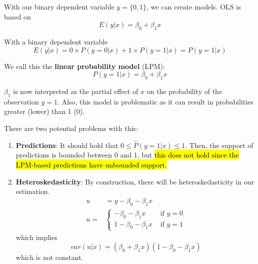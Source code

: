 \documentclass[11pt]{article}
\begin{document}
With our binary dependent variable $y=\{0,1\}$, we can create models. OLS is based on
\[E(y|x) = \beta_0 + \beta_1 x\]

With a binary dependent variable
\[E(y|x) = 0 \times P(y=0|x) + 1\times P(y=1|x) = P(y=1|x)\]

We call this the \textbf{linear probability model} (LPM):
\begin{equation}
    \label{linear probability model}
    P(y=1|x) = \beta_0 + \beta_1 x
\end{equation}
\begin{note}
    $\beta_1$ is now interpreted as the partial effect of $x$ on the probability of the observation $y=1$. Also, this model is problematic as it can result in probabilities greater (lower) than 1 (0).
\end{note}

\begin{shaded}
There are two potential problems with this:
\begin{enumerate}
    \item \textbf{Predictions}: It should hold that $0\leq \hat{P}(y=1|x) \leq1$. Then, the support of predictions is bounded between 0 and 1, but \hl{this does not hold since the LPM-based predictions have unbounded support.}

    \item \textbf{Heteroskedasticity}: By construction, there will be heteroskedasticity in our estimation.
    \begin{equation}
        \begin{aligned}
        u &= y-\beta_0 - \beta_1 x \\
        u =& \begin{cases}
            - \beta_0 - \beta_1 x & \text{ if } y = 0 \\
            1 - \beta_0 - \beta_1 x & \text{ if } y = 1
        \end{cases}
        \end{aligned}
    \end{equation}
    which implies
    \begin{equation}
        \label{heteroskedasticity in LPM}
        var(u|x) = (\beta_0 + \beta_1 x)(1 - \beta_0 - \beta_1 x)
    \end{equation}
    which is not constant.
\end{enumerate}
\end{shaded}
\end{document}
